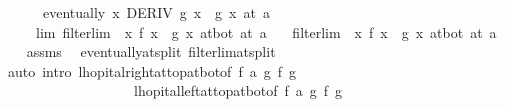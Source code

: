 \begin{isabellebody}
\ \ \ \ \ \ {\isachardoublequoteopen}eventually\ {\isacharparenleft}{\kern0pt}{\isasymlambda}x{\isachardot}{\kern0pt}\ DERIV\ g\ x\ {\isacharcolon}{\kern0pt}{\isachargreater}{\kern0pt}\ g{\isacharprime}{\kern0pt}\ x{\isacharparenright}{\kern0pt}\ {\isacharparenleft}{\kern0pt}at\ a{\isacharparenright}{\kern0pt}{\isachardoublequoteclose}\isanewline
\ \ \ \ \ lim{\isacharcolon}{\kern0pt}\ {\isachardoublequoteopen}filterlim\ {\isacharparenleft}{\kern0pt}{\isasymlambda}\ x{\isachardot}{\kern0pt}\ {\isacharparenleft}{\kern0pt}f{\isacharprime}{\kern0pt}\ x\ {\isacharslash}{\kern0pt}\ g{\isacharprime}{\kern0pt}\ x{\isacharparenright}{\kern0pt}{\isacharparenright}{\kern0pt}\ at{\isacharunderscore}{\kern0pt}bot\ {\isacharparenleft}{\kern0pt}at\ a{\isacharparenright}{\kern0pt}{\isachardoublequoteclose}\isanewline
\ \ \ {\isachardoublequoteopen}filterlim\ {\isacharparenleft}{\kern0pt}{\isasymlambda}\ x{\isachardot}{\kern0pt}\ f\ x\ {\isacharslash}{\kern0pt}\ g\ x{\isacharparenright}{\kern0pt}\ at{\isacharunderscore}{\kern0pt}bot\ {\isacharparenleft}{\kern0pt}at\ a{\isacharparenright}{\kern0pt}{\isachardoublequoteclose}\isanewline
%
\isadelimproof
\ \ %
\endisadelimproof
%
\isatagproof
{}\isamarkupfalse%
\ assms\ \isamarkupfalse%
\ eventually{\isacharunderscore}{\kern0pt}at{\isacharunderscore}{\kern0pt}split\ filterlim{\isacharunderscore}{\kern0pt}at{\isacharunderscore}{\kern0pt}split\isanewline
\ \ \isamarkupfalse%
\ {\isacharparenleft}{\kern0pt}auto\ intro{\isacharbang}{\kern0pt}{\isacharcolon}{\kern0pt}\ lhopital{\isacharunderscore}{\kern0pt}right{\isacharunderscore}{\kern0pt}at{\isacharunderscore}{\kern0pt}top{\isacharunderscore}{\kern0pt}at{\isacharunderscore}{\kern0pt}bot{\isacharbrackleft}{\kern0pt}of\ f\ a\ g\ f{\isacharprime}{\kern0pt}\ g{\isacharprime}{\kern0pt}{\isacharbrackright}{\kern0pt}\ \isanewline
\ \ \ \ \ \ \ \ \ \ \ \ \ \ \ \ \ \ \ lhopital{\isacharunderscore}{\kern0pt}left{\isacharunderscore}{\kern0pt}at{\isacharunderscore}{\kern0pt}top{\isacharunderscore}{\kern0pt}at{\isacharunderscore}{\kern0pt}bot{\isacharbrackleft}{\kern0pt}of\ f\ a\ g\ f{\isacharprime}{\kern0pt}\ g{\isacharprime}{\kern0pt}{\isacharbrackright}{\kern0pt}{\isacharparenright}{\kern0pt}%
\endisatagproof
{\isafoldproof}%
%
\isadelimproof
\isanewline
%
\endisadelimproof
%
\isadelimtheory
\isanewline
%
\endisadelimtheory
%
\isatagtheory
{}\isamarkupfalse%
%
\endisatagtheory
{\isafoldtheory}%
%
\isadelimtheory
%
\endisadelimtheory
%
\end{isabellebody}%
